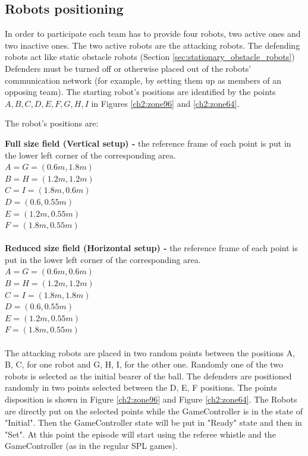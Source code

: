 \subsection{Robots positioning}
In order to participate each team has to provide four robots, two active ones and two inactive ones. The two active robots are the attacking robots. The defending robots act like static obstacle robots (\cf Section \ref{sec:stationary_obstacle_robots})
Defenders must be turned off or otherwise placed out of the robots' communication network (for example, by setting them up as members of an opposing team).
The starting robot's positions are identified by the points ${A,B,C,D,E,F,G,H,I}$ in Figures \ref{ch2:zone96} and \ref{ch2:zone64}.

The robot's positions are:

\textbf{Full size field (Vertical setup) -} the reference frame of each point is put in the lower left corner of the corresponding area.
\\
$A = G = (0.6m, 1.8m)$
\\
$B = H = (1.2m, 1.2m)$
\\
$C = I = (1.8m, 0.6m)$
\\
$D = (0.6, 0.55m)$
\\
$E = (1.2m, 0.55m)$
\\
$F = (1.8m, 0.55m)$
\\
\\
\textbf{Reduced size field (Horizontal setup) -} the reference frame of each point is put in the lower left corner of the corresponding area.
\\
$A = G = (0.6m, 0.6m)$
\\
$B = H = (1.2m, 1.2m)$
\\
$C = I = (1.8m, 1.8m)$
\\
$D = (0.6, 0.55m)$
\\
$E = (1.2m, 0.55m)$
\\
$F = (1.8m, 0.55m)$
\\
\\
The attacking robots are placed in two random points between the positions A, B, C, for one robot and G, H, I, for the other one.  Randomly one of the two robots is selected as the initial bearer of the ball. The defenders are positioned randomly in two points selected between the D, E, F positions.
The points disposition is shown in Figure \ref{ch2:zone96} and Figure \ref{ch2:zone64}.
The Robots are directly put on the selected points while the GameController is in the state of "Initial". Then the GameController state will be put in "Ready" state and then in "Set". At this point the episode will start using the referee whistle and the GameController (as in the regular SPL games). 

